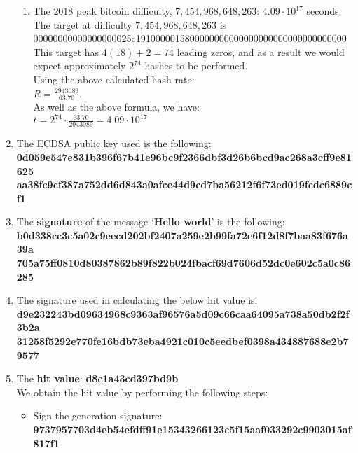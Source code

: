 \documentclass[12pt, a4paper]{article}
\begin{document}
\begin{enumerate}
\begin{enumerate}
\item The $2018$ peak bitcoin difficulty, $7,454,968,648,263$: $4.09 \cdot 10^{17}$ seconds.\\
\phantom{a}The target at difficulty $7,454,968,648,263$ is\\
\phantom{abc}00000000000000000025c1910000015800000000000000000000000000000000\\ \phantom{a}This target has $4(18) + 2 = 74$ leading zeros, and as a result we would expect approximately \phantom{a}$2^{74}$ hashes to be performed.\\
\phantom{a}Using the above calculated hash rate: \\
\phantom{a}$R = \frac{2943089}{63.70}$.\\
\phantom{a}As well as the above formula, we have:\\
\phantom{abc} $t = 2^{74} \cdot  \frac{63.70}{2943089} = 4.09 \cdot 10^{17}$
\end{enumerate}
\item The ECDSA public key used is the following:\\ 
\phantom{abc}\textbf{0d059e547e831b396f67b41e96bc9f2366dbf3d26b6bcd9ac268a3cff9e81625}\\
\phantom{abc}\textbf{aa38fc9cf387a752dd6d843a0afce44d9cd7ba56212f6f73ed019fcdc6889cf1}
\item The \textbf{signature} of the message `\textbf{Hello world}' is the following:\\ 
\phantom{abc}\textbf{b0d338cc3c5a02c9eecd202bf2407a259e2b99fa72e6f12d8f7baa83f676a39a}\\
\phantom{abc}\textbf{705a75ff0810d80387862b89f822b024fbacf69d7606d52dc0e602c5a0c86285}
\item The signature used in calculating the below hit value is:\\
\phantom{abc}\textbf{d9e232243bd09634968c9363af96576a5d09c66caa64095a738a50db2f2f3b2a}\\
\phantom{abc}\textbf{31258f5292e770fe16bdb73eba4921c010c5eedbef0398a434887688e2b79577}
\item The \textbf{hit value}: \textbf{d8c1a43cd397bd9b}\\
\phantom{a} We obtain the hit value by performing the following steps:
\begin{itemize}
\renewcommand\labelitemi{\tiny$\bullet$}
\itemsep0em
\item Sign the generation signature:\\ \phantom{abc} \textbf{9737957703d4eb54efdff91e15343266123c5f15aaf033292c9903015af817f1}\\

\end{itemize}
\end{enumerate}
\end{document}
